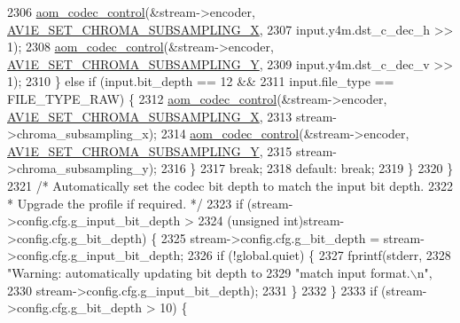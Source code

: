 \begin{DoxyCodeInclude}
{{{{{{{{{{{{{{{{{{{{{{{{{{{{{{{{{{{{{{{{{{{{{{{{{{{{2306               \hyperlink{group__codec_ga6da974f4eeaba1fa74106b28d0fe6ac5}{aom\_codec\_control}(&stream->encoder, 
      \hyperlink{group__aom__encoder_ggae78dde67a6d78f332e9bdba0dde42db5a283dd3f4387e5f3a754fea0d206b1cb0}{AV1E\_SET\_CHROMA\_SUBSAMPLING\_X},
2307                                 input.y4m.dst\_c\_dec\_h >> 1);
2308               \hyperlink{group__codec_ga6da974f4eeaba1fa74106b28d0fe6ac5}{aom\_codec\_control}(&stream->encoder, 
      \hyperlink{group__aom__encoder_ggae78dde67a6d78f332e9bdba0dde42db5a501a9453d5790f32c001e9877d3db40c}{AV1E\_SET\_CHROMA\_SUBSAMPLING\_Y},
2309                                 input.y4m.dst\_c\_dec\_v >> 1);
2310             \} \textcolor{keywordflow}{else} \textcolor{keywordflow}{if} (input.bit\_depth == 12 &&
2311                        input.file\_type == FILE\_TYPE\_RAW) \{
2312               \hyperlink{group__codec_ga6da974f4eeaba1fa74106b28d0fe6ac5}{aom\_codec\_control}(&stream->encoder, 
      \hyperlink{group__aom__encoder_ggae78dde67a6d78f332e9bdba0dde42db5a283dd3f4387e5f3a754fea0d206b1cb0}{AV1E\_SET\_CHROMA\_SUBSAMPLING\_X},
2313                                 stream->chroma\_subsampling\_x);
2314               \hyperlink{group__codec_ga6da974f4eeaba1fa74106b28d0fe6ac5}{aom\_codec\_control}(&stream->encoder, 
      \hyperlink{group__aom__encoder_ggae78dde67a6d78f332e9bdba0dde42db5a501a9453d5790f32c001e9877d3db40c}{AV1E\_SET\_CHROMA\_SUBSAMPLING\_Y},
2315                                 stream->chroma\_subsampling\_y);
2316             \}
2317             \textcolor{keywordflow}{break};
2318           \textcolor{keywordflow}{default}: \textcolor{keywordflow}{break};
2319         \}
2320       \}
2321       \textcolor{comment}{/* Automatically set the codec bit depth to match the input bit depth.}
2322 \textcolor{comment}{       * Upgrade the profile if required. */}
2323       \textcolor{keywordflow}{if} (stream->config.cfg.g\_input\_bit\_depth >
2324           (\textcolor{keywordtype}{unsigned} \textcolor{keywordtype}{int})stream->config.cfg.g\_bit\_depth) \{
2325         stream->config.cfg.g\_bit\_depth = stream->config.cfg.g\_input\_bit\_depth;
2326         \textcolor{keywordflow}{if} (!global.quiet) \{
2327           fprintf(stderr,
2328                   \textcolor{stringliteral}{"Warning: automatically updating bit depth to %
2329                   \textcolor{stringliteral}{"match input format.\(\backslash\)n"},
2330                   stream->config.cfg.g\_input\_bit\_depth);
2331         \}
2332       \}
2333       \textcolor{keywordflow}{if} (stream->config.cfg.g\_bit\_depth > 10) \{
}}}}}}}}}}}}}}}}}}}}}}}}}}}}}}}}}}}}}}}}}}}}}}}}}}}}}
\end{DoxyCodeInclude}
